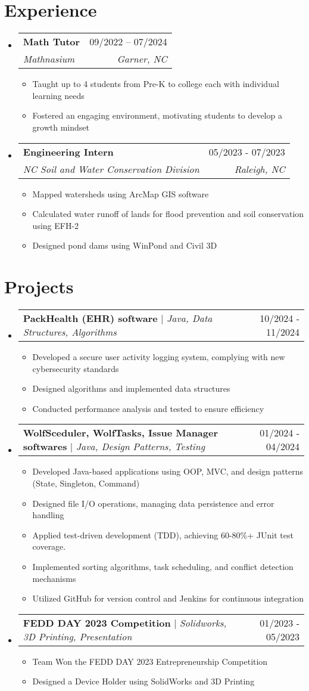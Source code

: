 \documentclass[letterpaper,11pt]{article}
\makeatletter
\newcommand{\resumeItem}[1]{
  \item\small{
    {#1 \vspace{-2pt}}
  }
}
\newcommand{\resumeSubheading}[4]{
  \vspace{-2pt}\item
    \begin{tabular*}{0.97\textwidth}[t]{l@{\extracolsep{\fill}}r}
      \textbf{#1} & #2 \\
      \textit{\small#3} & \textit{\small #4} \\
    \end{tabular*}\vspace{-7pt}
}
\newcommand{\resumeProjectHeading}[2]{
    \item
    \begin{tabular*}{0.97\textwidth}{l@{\extracolsep{\fill}}r}
      \small#1 & #2 \\
    \end{tabular*}\vspace{-7pt}
}
\newcommand{\resumeSubHeadingListStart}{\begin{itemize}[leftmargin=0.15in, label={}]}
\newcommand{\resumeSubHeadingListEnd}{\end{itemize}}
\newcommand{\resumeItemListStart}{\begin{itemize}}
\newcommand{\resumeItemListEnd}{\end{itemize}\vspace{-5pt}}
\makeatother
\begin{document}
\section{Experience}
  \resumeSubHeadingListStart
    \resumeSubheading
      {Math Tutor}{09/2022 – 07/2024}
      {Mathnasium}{Garner, NC}
      \resumeItemListStart
        \resumeItem{Taught up to 4 students from Pre-K to college each with individual learning needs}
        \resumeItem{Fostered an engaging environment, motivating students to develop a growth mindset}
    \resumeItemListEnd

    \resumeSubheading
      {Engineering Intern}{05/2023 - 07/2023}
      {NC Soil and Water Conservation Division}{Raleigh, NC}
      \resumeItemListStart
        \resumeItem{Mapped watersheds using ArcMap GIS software}
        \resumeItem{Calculated water runoff of lands for flood prevention and soil conservation using EFH-2}
        \resumeItem{Designed pond dams using WinPond and Civil 3D}
      \resumeItemListEnd

  \resumeSubHeadingListEnd

  
\section{Projects}
    \resumeSubHeadingListStart
      \resumeProjectHeading
          {\textbf{PackHealth (EHR) software} $|$ \emph{Java, Data Structures, Algorithms}}{10/2024 - 11/2024}
          \resumeItemListStart
            \resumeItem{Developed a secure user activity logging system, complying with new cybersecurity standards}
            \resumeItem{Designed algorithms and implemented data structures}
            \resumeItem{Conducted performance analysis and tested to ensure efficiency}
          \resumeItemListEnd
        \resumeProjectHeading
          {\textbf{WolfSceduler, WolfTasks, Issue Manager softwares} $|$ \emph{Java, Design Patterns, Testing}}{01/2024 - 04/2024}
          \resumeItemListStart
            \resumeItem{Developed Java-based applications using OOP, MVC, and design patterns (State, Singleton, Command)}
            \resumeItem{Designed file I/O operations, managing data persistence and error handling}
            \resumeItem{Applied test-driven development (TDD), achieving 60-80\%+ JUnit test coverage.}
            \resumeItem{Implemented sorting algorithms, task scheduling, and conflict detection mechanisms}
            \resumeItem{Utilized GitHub for version control and Jenkins for continuous integration}
          \resumeItemListEnd
      \resumeProjectHeading
          {\textbf{FEDD DAY 2023 Competition} $|$ \emph{Solidworks, 3D Printing, Presentation}}{01/2023 - 05/2023}
          \resumeItemListStart
            \resumeItem{Team Won the FEDD DAY 2023 Entrepreneurship Competition}
            \resumeItem{Designed a Device Holder using SolidWorks and 3D Printing}
          \resumeItemListEnd
    \resumeSubHeadingListEnd
\end{document}
